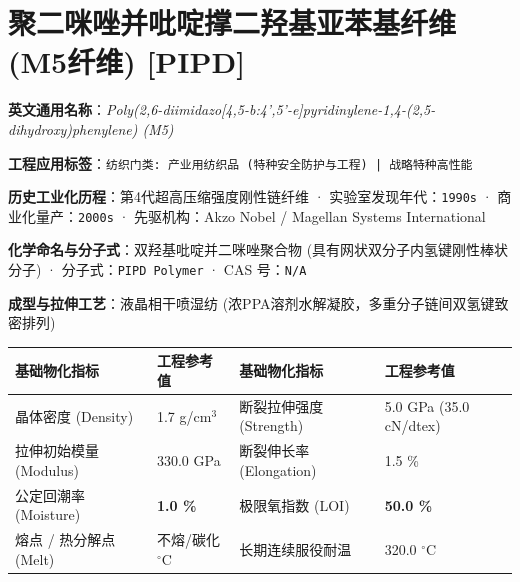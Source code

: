 \documentclass[11pt,openright,twoside,UTF8]{ctexbook}
\begin{document}
\section{聚二咪唑并吡啶撑二羟基亚苯基纤维 (M5纤维) [PIPD]}
\label{sec:pipd}

\noindent\textbf{英文通用名称}：\textit{Poly(2,6-diimidazo[4,5-b:4',5'-e]pyridinylene-1,4-(2,5-dihydroxy)phenylene) (M5)}\par
\noindent\textbf{工程应用标签}：\texttt{纺织门类: 产业用纺织品 (特种安全防护与工程) | 战略特种高性能}\par
\noindent\textbf{历史工业化历程}：第4代超高压缩强度刚性链纤维 · 实验室发现年代：\texttt{1990s} · 商业化量产：\texttt{2000s} · 先驱机构：Akzo Nobel / Magellan Systems International\par
\noindent\textbf{化学命名与分子式}：双羟基吡啶并二咪唑聚合物 (具有网状双分子内氢键刚性棒状分子) · 分子式：\texttt{PIPD Polymer} · CAS 号：\texttt{N/A}\par
\noindent\textbf{成型与拉伸工艺}：液晶相干喷湿纺 (浓PPA溶剂水解凝胶，多重分子链间双氢键致密排列)\par

\vspace{0.15cm}
\begin{center}
\small
\begin{tabularx}{\textwidth}{p{3.8cm}Xp{3.8cm}X}
\toprule
\textbf{基础物化指标} & \textbf{工程参考值} & \textbf{基础物化指标} & \textbf{工程参考值} \\
\midrule
晶体密度 (Density) & 1.7 g/cm$^3$ & 断裂拉伸强度 (Strength) & 5.0 GPa (35.0 cN/dtex) \\
拉伸初始模量 (Modulus) & 330.0 GPa & 断裂伸长率 (Elongation) & 1.5 \% \\
公定回潮率 (Moisture) & \textbf{1.0 \%} & 极限氧指数 (LOI) & \textbf{50.0 \%} \\
熔点 / 热分解点 (Melt) & 不熔/碳化 $^\circ\mathrm{C}$ & 长期连续服役耐温 & 320.0 $^\circ\mathrm{C}$ \\
\bottomrule
\end{tabularx}
\end{center}
\vspace{0.15cm}
\end{document}
